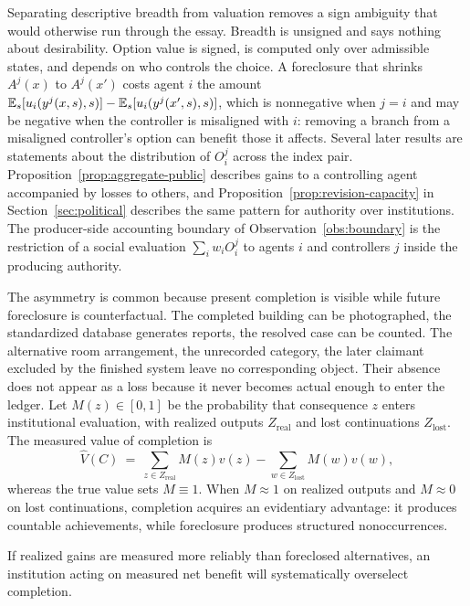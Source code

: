 Separating descriptive breadth from valuation removes a sign ambiguity that would otherwise run through the essay. Breadth is unsigned and says nothing about desirability. Option value is signed, is computed only over admissible states, and depends on who controls the choice. A foreclosure that shrinks $A^j(x)$ to $A^j(x')$ costs agent $i$ the amount $\mathbb{E}_s[u_i(y^j(x,s),s)]-\mathbb{E}_s[u_i(y^j(x',s),s)]$, which is nonnegative when $j=i$ and may be negative when the controller is misaligned with $i$: removing a branch from a misaligned controller's option can benefit those it affects. Several later results are statements about the distribution of $O_i^j$ across the index pair. Proposition~\ref{prop:aggregate-public} describes gains to a controlling agent accompanied by losses to others, and Proposition~\ref{prop:revision-capacity} in Section~\ref{sec:political} describes the same pattern for authority over institutions. The producer-side accounting boundary of Observation~\ref{obs:boundary} is the restriction of a social evaluation $\sum_iw_iO_i^j$ to agents $i$ and controllers $j$ inside the producing authority.

The asymmetry is common because present completion is visible while future foreclosure is counterfactual. The completed building can be photographed, the standardized database generates reports, the resolved case can be counted. The alternative room arrangement, the unrecorded category, the later claimant excluded by the finished system leave no corresponding object. Their absence does not appear as a loss because it never becomes actual enough to enter the ledger. Let $M(z)\in[0,1]$ be the probability that consequence $z$ enters institutional evaluation, with realized outputs $Z_{\mathrm{real}}$ and lost continuations $Z_{\mathrm{lost}}$. The measured value of completion is
\begin{equation}
\widehat V(C)\ =\ \sum_{z\in Z_{\mathrm{real}}}M(z)v(z)-\sum_{w\in Z_{\mathrm{lost}}}M(w)v(w),
\end{equation}
whereas the true value sets $M\equiv 1$. When $M\approx 1$ on realized outputs and $M\approx 0$ on lost continuations, completion acquires an evidentiary advantage: it produces countable achievements, while foreclosure produces structured nonoccurrences.

\begin{observation}\label{obs:measurability}
If realized gains are measured more reliably than foreclosed alternatives, an institution acting on measured net benefit will systematically overselect completion.
\end{observation}

